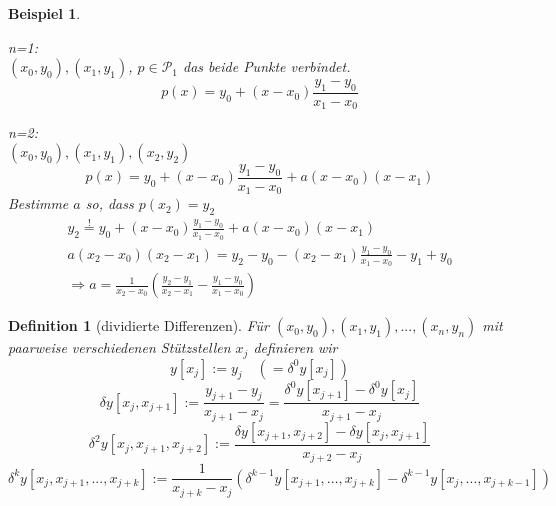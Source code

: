 \documentclass[12pt]{article}
\theoremstyle{break}
\newtheorem{definition}[theorem]{Definition}
\newtheorem{example}[theorem]{Beispiel}
\begin{document}
\begin{example}
\begin{description}\item \end{description}
\begin{description}
  \item n=1: \\
    $(x_0, y_0),(x_1,y_1)$, $p \in \mathcal{P}_1$ das beide Punkte verbindet.\\
    $$p(x) = y_0 + (x-x_0) \frac{y_1-y_0}{x_1-x_0}$$
  \item n=2: \\
    $(x_0, y_0),(x_1,y_1),(x_2,y_2)$ \\
    $$p(x) = y_0 + (x-x_0) \frac{y_1-y_0}{x_1-x_0} + a(x-x_0)(x-x_1)$$
    Bestimme $a$ so, dass $p(x_2) = y_2$
    \begin{align*}
    y_2 \overset{!}{=} y_0 + (x-x_0) \frac{y_1-y_0}{x_1-x_0} + a(x-x_0)(x-x_1)\\
    a(x_2-x_0)(x_2-x_1) = y_2 - y_0 - (x_2-x_1) \frac{y_1-y_0}{x_1-x_0} - y_1 + y_0 \\
    \Rightarrow a = \frac{1}{x_2-x_0} \left( \frac{y_2-y_1}{x_2-x_1} - \frac{y_1-y_0}{x_1-x_0} \right) 
     \end{align*}
\end{description}
\end{example}

\begin{definition}[dividierte Differenzen]
Für $(x_0,y_0), (x_1, y_1), ..., (x_n, y_n)$ mit paarweise verschiedenen Stützstellen $x_j$ definieren wir
$$ y[x_j] := y_j \quad \left( = \delta^0 y[x_j] \right) $$ 
$$ \delta y[x_j, x_{j+1}] := \frac{y_{j+1} - y_j}{x_{j+1}-x_j} = \frac{\delta^0 y[x_{j+1}]-\delta^0 y[x_{j}]}{x_{j+1} - x_j}$$
$$ \delta ^2 y[x_j, x_{j+1}, x_{j+2}] := \frac{\delta y[x_{j+1}, x_{j+2}]-\delta y[x_{j}, x_{j+1}]}{x_{j+2} - x_j}$$
$$ \delta ^k y[x_j, x_{j+1},..., x_{j+k}] := \frac{1}{x_{j+k}-x_j} \left( \delta^{k-1} y[x_{j+1}, ..., x_{j+k}] - \delta^{k-1} y[x_j, ..., x_{j+k-1}] \right)$$
\end{definition}
\end{document}
